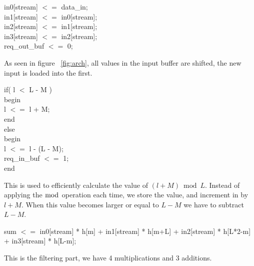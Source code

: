 \begin{center}
\parbox{10cm}{
in0[stream] $<=$ data\_in;\\
in1[stream] $<=$ in0[stream];\\
in2[stream] $<=$ in1[stream];\\
in3[stream] $<=$ in2[stream];\\
req\_out\_buf $<=$ 0;\\
}
\end{center}
As seen in figure ~\ref{fig:arch}, all values in the input buffer are shifted, the new input is loaded into the first.\\
\begin{center}
\parbox{10cm}{
if( l $<$ L - M )\\
begin\\
\phantom{xxxx} l $<=$ l + M;\\
end\\
else\\
begin\\
\phantom{xxxx}l $<=$ l - (L - M);\\
\phantom{xxxx}req\_in\_buf $<=$ 1;\\
end\\
}
\end{center}
This is used to efficiently calculate the value of $(l + M) \bmod L$. Instead of applying the $\bmod$ operation each time, we store the value, and increment in by $l + M$. When this value becomes larger or equal to  $L - M$ we have to subtract $L - M$.\\
\begin{center}
\parbox{10cm}{
sum $<=$ in0[stream] * h[m] + in1[stream] * h[m+L] + in2[stream] * h[L*2-m] + in3[stream] * h[L-m];
}
\end{center}
This is the filtering part, we have 4 multiplications and 3 additions.
